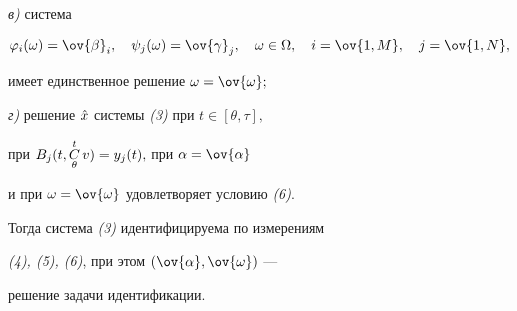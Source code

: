 \begin{thm}
{\em в)} система


\begin{equation}


\varphi_i(\omega) = \ov{\beta}_i,\quad


\psi_j(\omega) = \ov{\gamma}_j,\quad


\omega\in\Omega,\quad i=\ov{1,M},\quad j=\ov{1,N},


\end{equation}


имеет единственное решение $\omega = \ov{\omega};$





{\em г)} решение $\Hat{x}$ системы {\em (3)} при $t\in[\theta,\tau],$


при $B_j(t,\underset{\theta}{\overset{t}{C}}{}\, v) = y_j(t),$ при $\alpha=\ov{\alpha}$


и при $\omega=\ov{\omega}$ удовлетворяет условию {\em (6)}.





Тогда система {\em (3)} идентифицируема по измерениям


{\em (4), (5), (6)}, при этом $(\ov{\alpha},\ov{\omega})$ ---


решение задачи идентификации.


\end{thm}





